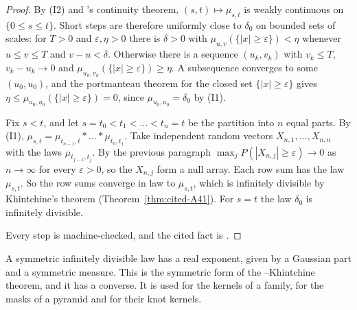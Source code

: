 \begin{proof}
\leanok
By (I2) and \Levy's continuity theorem, $(s,t) \mapsto \mu_{s,t}$ is weakly continuous on
$\{0 \le s \le t\}$. Short steps are therefore uniformly close to $\delta_0$ on bounded sets of
scales: for $T > 0$ and $\varepsilon, \eta > 0$ there is $\delta > 0$ with
$\mu_{u,v}(\{|x| \ge \varepsilon\}) < \eta$ whenever $u \le v \le T$ and $v - u < \delta$. Otherwise
there is a sequence $(u_k, v_k)$ with $v_k \le T$, $v_k - u_k \to 0$ and
$\mu_{u_k,v_k}(\{|x| \ge \varepsilon\}) \ge \eta$. A subsequence converges to some $(u_0, u_0)$, and
the portmanteau theorem for the closed set $\{|x| \ge \varepsilon\}$ gives
$\eta \le \mu_{u_0,u_0}(\{|x| \ge \varepsilon\}) = 0$, since $\mu_{u_0,u_0} = \delta_0$ by (I1).

Fix $s < t$, and let $s = t_0 < t_1 < \dots < t_n = t$ be the partition into $n$ equal parts. By
(I1), $\mu_{s,t} = \mu_{t_{n-1},t} * \dots * \mu_{t_0,t_1}$. Take independent random vectors
$X_{n,1}, \dots, X_{n,n}$ with the laws $\mu_{t_{j-1},t_j}$. By the previous paragraph
$\max_jP(|X_{n,j}| \ge \varepsilon) \to 0$ as $n \to \infty$ for every $\varepsilon > 0$, so the
$X_{n,j}$ form a null array. Each row sum has the law $\mu_{s,t}$. So the row sums converge in law to
$\mu_{s,t}$, which is infinitely divisible by Khintchine's theorem
(Theorem~\ref{thm:cited-A41}). For $s = t$ the law $\delta_0$ is infinitely divisible.

Every step is machine-checked, and the cited fact is .
\end{proof}

A symmetric infinitely divisible law has a real exponent, given by a Gaussian part and a symmetric
\Levy{} measure. This is the symmetric form of the \Levy--Khintchine theorem, and it has a converse.
It is used for the kernels of a family, for the masks of a pyramid and for their knot kernels.

